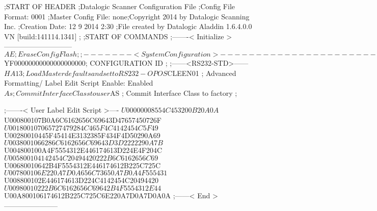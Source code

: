 ;START OF HEADER
;Datalogic Scanner Configuration File
;Config File Format: 0001
;Master Config File: none;Copyright 2014 by Datalogic Scanning Inc.
;Creation Date: 12 9 2014 2:30
;File created by Datalogic Aladdin 1.6.4.0.0 VN [build:141114.1341]
;
;START OF COMMANDS
;-------< Initialize >-----------------------------
$AE                 ; Erase Config Flash
;
;-------< System Configuration >-------------------------------
$YF00000000000000000000; CONFIGURATION ID
;
;------<RS232-STD>------
$HA13               ; Load Master defaults and set to RS232-OPOS
$CLEEN01            ; Advanced Formatting/ Label Edit Script Enable: Enabled
$As                 ; Commit Interface Class to user
$AS                 ; Commit Interface Class to factory
;

;-------< User Label Edit Script >----
$U00000008554C453200B20A0A
$U000800107B0A6C6162656C69643D47657450726F
$U001800107065727479284C465F4C4142454C5F49
$U00280010445F45414E3132385F434F4D50290A69
$U0038001066286C6162656C69643D3D2222290A7B
$U004800100A4F5554312E446174613D224E4F204C
$U005800104142454C20494420222B6C6162656C69
$U00680010642B4F5554312E446174612B225C725C
$U007800106E220A7D0A656C73650A7B0A4F555431
$U008800102E446174613D224C4142454C20494420
$U00980010222B6C6162656C69642B4F5554312E44
$U00A800106174612B225C725C6E220A7D0A7D0A0A
;------< End >-----------------------
